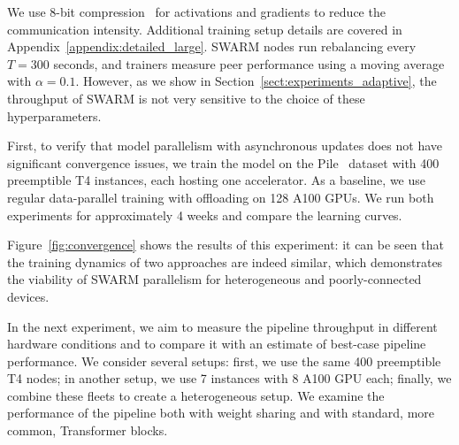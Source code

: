 We use 8-bit compression~\citep{adam8bit} for activations and gradients to reduce the communication intensity. Additional training setup details are covered in Appendix~\ref{appendix:detailed_large}.
SWARM nodes run rebalancing every $T=300$ seconds, and trainers measure peer performance using a moving average with $\alpha=0.1$. However, as we show in Section~\ref{sect:experiments_adaptive}, the throughput of SWARM is not very sensitive to the choice of these hyperparameters.



First, to verify that model parallelism with asynchronous updates does not have significant convergence issues, we train the model on the Pile~\citep{gao2020pile} dataset with 400 preemptible T4 instances, each hosting one accelerator. As a baseline, we use regular data-parallel training with offloading on 128 A100 GPUs.
We run both experiments for approximately 4 weeks and compare the learning curves.




Figure~\ref{fig:convergence} shows the results of this experiment: it can be seen that the training dynamics of two approaches are indeed similar, which demonstrates the viability of SWARM parallelism for heterogeneous and poorly-connected devices.

In the next experiment, we aim to measure the pipeline throughput in different hardware conditions and to compare it with an estimate of best-case pipeline performance.
We consider several setups: first, we use the same 400 preemptible T4 nodes; in another setup, we use 7 instances with 8 A100 GPU each; finally, we combine these fleets to create a heterogeneous setup. We examine the performance of the pipeline both with weight sharing and with standard, more common, Transformer blocks.

